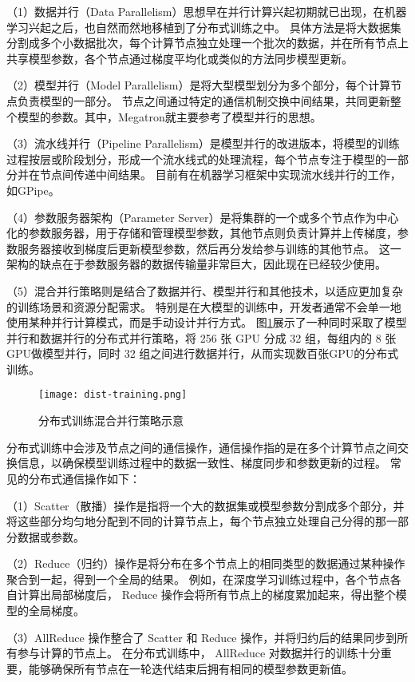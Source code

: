 （1）数据并行（Data Parallelism）思想早在并行计算兴起初期就已出现，在机器学习兴起之后，也自然而然地移植到了分布式训练之中。
具体方法是将大数据集分割成多个小数据批次，每个计算节点独立处理一个批次的数据，并在所有节点上共享模型参数，各个节点通过梯度平均化或类似的方法同步模型更新。

（2）模型并行（Model Parallelism）是将大型模型划分为多个部分，每个计算节点负责模型的一部分。
节点之间通过特定的通信机制交换中间结果，共同更新整个模型的参数。其中，Megatron就主要参考了模型并行的思想。

（3）流水线并行（Pipeline Parallelism）是模型并行的改进版本，将模型的训练过程按层或阶段划分，形成一个流水线式的处理流程，每个节点专注于模型的一部分并在节点间传递中间结果。
目前有在机器学习框架中实现流水线并行的工作，如GPipe。

（4）参数服务器架构（Parameter Server）是将集群的一个或多个节点作为中心化的参数服务器，用于存储和管理模型参数，其他节点则负责计算并上传梯度，参数服务器接收到梯度后更新模型参数，然后再分发给参与训练的其他节点。
这一架构的缺点在于参数服务器的数据传输量非常巨大，因此现在已经较少使用。

（5）混合并行策略则是结合了数据并行、模型并行和其他技术，以适应更加复杂的训练场景和资源分配需求。
特别是在大模型的训练中，开发者通常不会单一地使用某种并行计算模式，而是手动设计并行方式。
图\ref{fig:disttraining}展示了一种同时采取了模型并行和数据并行的分布式并行策略，将 256 张 GPU 分成 32 组，每组内的 8 张GPU做模型并行，同时 32 组之间进行数据并行，从而实现数百张GPU的分布式训练。

\begin{figure}
  \centering
  \texttt{[image: dist-training.png]}
  \caption{分布式训练混合并行策略示意}
  \label{fig:disttraining}
\end{figure}

分布式训练中会涉及节点之间的通信操作，通信操作指的是在多个计算节点之间交换信息，以确保模型训练过程中的数据一致性、梯度同步和参数更新的过程。
常见的分布式通信操作如下：

（1）Scatter（散播）操作是指将一个大的数据集或模型参数分割成多个部分，并将这些部分均匀地分配到不同的计算节点上，每个节点独立处理自己分得的那一部分数据或参数。

（2）Reduce（归约）操作是将分布在多个节点上的相同类型的数据通过某种操作聚合到一起，得到一个全局的结果。
例如，在深度学习训练过程中，各个节点各自计算出局部梯度后， Reduce 操作会将所有节点上的梯度累加起来，得出整个模型的全局梯度。

（3）AllReduce 操作整合了 Scatter 和 Reduce 操作，并将归约后的结果同步到所有参与计算的节点上。
在分布式训练中， AllReduce 对数据并行的训练十分重要，能够确保所有节点在一轮迭代结束后拥有相同的模型参数更新值。

